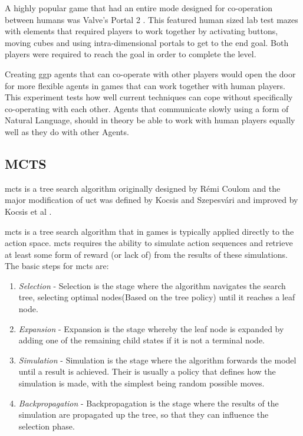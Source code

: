 \documentclass{IEEEtran}
\begin{document}
A highly popular game that had an entire mode designed for co-operation between humans was Valve's Portal 2 \cite{portal2}. This featured human sized lab test mazes with elements that required players to work together by activating buttons, moving cubes and using intra-dimensional portals to get to the end goal. Both players were required to reach the goal in order to complete the level.

Creating \gls{ggp} agents that can co-operate with other players would open the door for more flexible agents in games that can work together with human players. This experiment tests how well current techniques can cope without specifically co-operating with each other. Agents that communicate slowly using a form of Natural Language, should in theory be able to work with human players equally well as they do with other Agents.

\subsection{MCTS}

\gls{mcts} is a tree search algorithm originally designed by R{\'e}mi Coulom \cite{coulom2007efficient} and the major modification of \gls{uct} was defined by Kocsis and Szepesv{\'a}ri \cite{kocsis2006bandit} and improved by Kocsis et al \cite{kocsis2006improved}.

\gls{mcts} is a tree search algorithm that in games is typically applied directly to the action space. \gls{mcts} requires the ability to simulate action sequences and retrieve at least some form of reward (or lack of) from the results of these simulations. The basic steps for \gls{mcts} are:

\begin{enumerate}
\item{\emph{Selection} - Selection is the stage where the algorithm navigates the search tree, selecting optimal nodes(Based on the tree policy) until it reaches a leaf node.}
\item{\emph{Expansion} - Expansion is the stage whereby the leaf node is expanded by adding one of the remaining child states if it is not a terminal node.}
\item{\emph{Simulation} - Simulation is the stage where the algorithm forwards the model until a result is achieved. Their is usually a policy that defines how the simulation is made, with the simplest being random possible moves.}
\item{\emph{Backpropagation} - Backpropagation is the stage where the results of the simulation are propagated up the tree, so that they can influence the selection phase.}
\end{enumerate}
\end{document}
